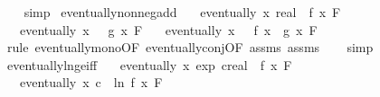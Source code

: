 \begin{isabellebody}
\ \ \isamarkupfalse%
\ simp%
\endisatagproof
{\isafoldproof}%
%
\isadelimproof
\isanewline
%
\endisadelimproof
\isanewline
{}\isamarkupfalse%
\ eventually{\isacharunderscore}{\kern0pt}nonneg{\isacharunderscore}{\kern0pt}add{\isacharcolon}{\kern0pt}\isanewline
\ \ \ {\isachardoublequoteopen}eventually\ {\isacharparenleft}{\kern0pt}{\isasymlambda}x{\isachardot}{\kern0pt}\ {\isacharparenleft}{\kern0pt}{}{\isacharcolon}{\kern0pt}{\isacharcolon}{\kern0pt}real{\isacharparenright}{\kern0pt}\ {\isasymle}\ f\ x{\isacharparenright}{\kern0pt}\ F{\isacharprime}{\kern0pt}{\isachardoublequoteclose}\isanewline
\ \ \ {\isachardoublequoteopen}eventually\ {\isacharparenleft}{\kern0pt}{\isasymlambda}x{\isachardot}{\kern0pt}\ {}\ {\isasymle}\ g\ x{\isacharparenright}{\kern0pt}\ F{\isacharprime}{\kern0pt}{\isachardoublequoteclose}\isanewline
\ \ \ {\isachardoublequoteopen}eventually\ {\isacharparenleft}{\kern0pt}{\isasymlambda}x{\isachardot}{\kern0pt}\ {}\ {\isasymle}\ f\ x\ {\isacharplus}{\kern0pt}\ g\ x{\isacharparenright}{\kern0pt}\ F{\isacharprime}{\kern0pt}{\isachardoublequoteclose}\isanewline
%
\isadelimproof
\ \ %
\endisadelimproof
%
\isatagproof
{}\isamarkupfalse%
\ {\isacharparenleft}{\kern0pt}rule\ eventually{\isacharunderscore}{\kern0pt}mono{\isacharbrackleft}{\kern0pt}OF\ eventually{\isacharunderscore}{\kern0pt}conj{\isacharbrackleft}{\kern0pt}OF\ assms{\isacharparenleft}{\kern0pt}{}{\isacharparenright}{\kern0pt}\ assms{\isacharparenleft}{\kern0pt}{}{\isacharparenright}{\kern0pt}{\isacharbrackright}{\kern0pt}{\isacharbrackright}{\kern0pt}{\isacharparenright}{\kern0pt}\isanewline
\ \ \isamarkupfalse%
\ simp%
\endisatagproof
{\isafoldproof}%
%
\isadelimproof
\isanewline
%
\endisadelimproof
\isanewline
{}\isamarkupfalse%
\ eventually{\isacharunderscore}{\kern0pt}ln{\isacharunderscore}{\kern0pt}ge{\isacharunderscore}{\kern0pt}iff{\isacharcolon}{\kern0pt}\isanewline
\ \ \ {\isachardoublequoteopen}eventually\ {\isacharparenleft}{\kern0pt}{\isasymlambda}x{\isachardot}{\kern0pt}\ {\isacharparenleft}{\kern0pt}exp\ {\isacharparenleft}{\kern0pt}c{\isacharcolon}{\kern0pt}{\isacharcolon}{\kern0pt}real{\isacharparenright}{\kern0pt}{\isacharparenright}{\kern0pt}\ {\isasymle}\ f\ x{\isacharparenright}{\kern0pt}\ F{\isacharprime}{\kern0pt}{\isachardoublequoteclose}\isanewline
\ \ \ {\isachardoublequoteopen}eventually\ {\isacharparenleft}{\kern0pt}{\isasymlambda}x{\isachardot}{\kern0pt}\ c\ {\isasymle}\ ln\ {\isacharparenleft}{\kern0pt}f\ x{\isacharparenright}{\kern0pt}{\isacharparenright}{\kern0pt}\ F{\isacharprime}{\kern0pt}{\isachardoublequoteclose}\isanewline

\end{isabellebody}
